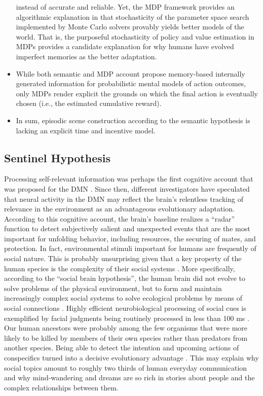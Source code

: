 \documentclass{article} %
\begin{document}
\begin{itemize}
  instead of accurate and reliable.
  Yet, the MDP framework provides an algorithmic explanation in that
  stochasticity of the parameter space search implemented
  by Monte Carlo solvers provably yields better models of the world.
  That is, the purposeful stochasticity of policy and value estimation
  in MDPs provides a candidate explanation for why humans
  have evolved imperfect memories as the better adaptation.
  \item While both semantic and MDP account propose memory-based internally
  generated information for probabilistic mental models of action outcomes,
  only MDPs render explicit the grounds on which the final action is
  eventually chosen (i.e., the estimated cumulative reward).
  \item In sum, episodic scene construction according to the semantic
  hypothesis is lacking an explicit time and incentive model.
\end{itemize}



\subsection{Sentinel Hypothesis}
Processing self-relevant information was perhaps the first
cognitive account that was proposed for the DMN \citep{gusnard2001medial}.
Since then,
different investigators have speculated that neural activity in the DMN
may reflect the brain’s relentless tracking of
relevance in the environment
as an advantageous evolutionary adaptation.
According to this cognitive account, the brain's baseline realizes
a ``radar'' function to
detect subjectively salient and unexpected events that
are the most important for unfolding behavior,
including resources,
the securing of mates, and protection.
%
In fact,
environmental stimuli important for humans are frequently of
social nature. This is probably unsurprising
given that a key property of the human species is
the complexity of their social systems
\citep{tomasello2009cultural}.
More specifically,
according to the ``social brain hypothesis'',
the human brain did not evolve to solve problems of the
physical environment, but to form and maintain increasingly complex
social systems to solve ecological problems by means of social connections
\citep{whiten1988machiavellian}.
Highly efficient neurobiological processing of social cues is exemplified by
facial judgments being routinely processed in less than 100 ms
\citep{bar2006very}.
Our human ancestors were probably among the few organisms that
were more likely to be killed by members of their own species
rather than predators from another species.
Being able to detect the intention and upcoming actions of conspecifics
turned into a decisive evolutionary advantage
\citep{frith2010social}.
%
This may explain why social topics amount to roughly
two thirds of human everyday communication \citep{dunbar1997human}
and
why mind-wandering and dreams
are so rich in stories about people and the complex relationships between them.
\end{document}
